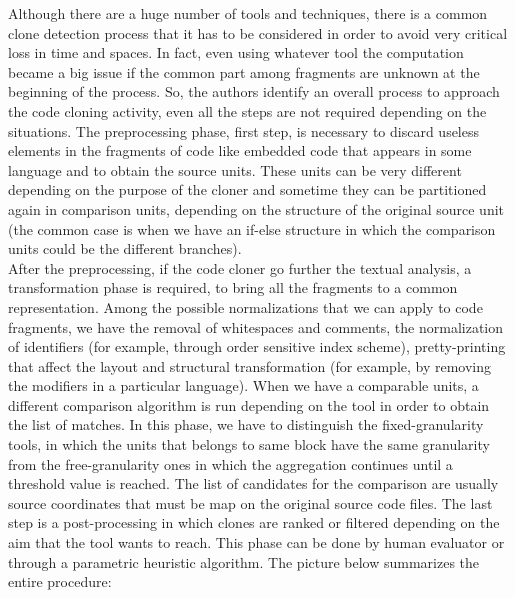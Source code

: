 Although there are a huge number of tools and techniques, there is a common 
clone detection process that it has to be considered in order to avoid very 
critical loss in time and spaces. In fact, even using whatever tool the 
computation became a big issue if the common part among fragments are unknown 
at the beginning of the process. So, the authors identify an overall process to 
approach the code cloning activity, even all the steps are not required 
depending on the situations. The preprocessing phase, first step, is necessary 
to discard useless elements in the fragments of code like embedded code that 
appears in some language and to obtain the source units. These units can be 
very different depending on the purpose of the cloner and sometime they can be 
partitioned again in comparison units, depending on the structure of the 
original source unit (the common case is when we have an if-else structure in 
which the comparison units could be the different branches). \\
After the preprocessing, if the code cloner go further the textual analysis, a 
transformation phase is required, to bring all the fragments to a common 
representation. Among the possible normalizations that we can apply to code 
fragments, we have the removal of whitespaces and comments, the normalization 
of identifiers (for example, through order sensitive index scheme), 
pretty-printing that affect the layout and structural transformation (for 
example, by removing the modifiers in a particular language). When we have a 
comparable units, a different comparison algorithm is run depending on the tool 
in order to obtain the list of matches. In this phase, we have to distinguish 
the fixed-granularity tools, in which the units that belongs to same block have 
the same granularity from the free-granularity ones in which the aggregation 
continues until a threshold value is reached. The list of candidates for the 
comparison are usually source coordinates that must be map on the original 
source code files. The last step is a post-processing in which clones are 
ranked or filtered depending on the aim that the tool wants to reach. This 
phase can be done by human evaluator or through a parametric heuristic 
algorithm. The picture below summarizes the entire procedure:\\

